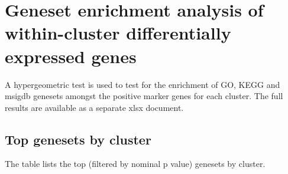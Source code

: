 \section{Geneset enrichment analysis of within-cluster differentially expressed genes}

A hypergeometric test is used to test for the enrichment of GO, KEGG and msigdb genesets amongst the positive marker genes for each cluster. The full results
are available as a separate xlsx document.



\clearpage

\subsection{Top genesets by cluster}

The table lists the top (filtered by nominal p value) genesets by cluster.



\clearpage
